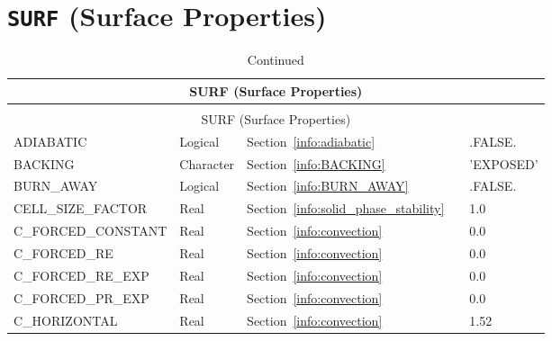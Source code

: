 \documentclass[11pt]{book}
\begin{document}
\vspace{\baselineskip}


\section{\texorpdfstring{{\tt SURF}}{SURF} (Surface Properties)}

\begin{longtable}{@{\extracolsep{\fill}}|l|l|l|l|l|}
\caption[Surface properties ({\ct SURF} namelist group)]{For more information see Section~\ref{info:SURF}.}
\label{tbl:SURF} \\
\hline
\multicolumn{5}{|c|}{{\ct SURF} (Surface Properties)} \\
\hline \hline
\endfirsthead
\caption[]{Continued} \\
\hline
\multicolumn{5}{|c|}{{\ct SURF} (Surface Properties)} \\
\hline \hline
\endhead
{\ct ADIABATIC}                       & Logical         & Section~\ref{info:adiabatic}              &                     & {\ct .FALSE.}           \\ \hline
{\ct BACKING}                         & Character       & Section~\ref{info:BACKING}                &                     & {\ct 'EXPOSED'}         \\ \hline
{\ct BURN\_AWAY}                      & Logical         & Section~\ref{info:BURN_AWAY}              &                     & {\ct .FALSE.}           \\ \hline
{\ct CELL\_SIZE\_FACTOR}              & Real            & Section~\ref{info:solid_phase_stability}  &                     & 1.0                     \\ \hline
{\ct C\_FORCED\_CONSTANT}             & Real            & Section~\ref{info:convection}             &                     & 0.0                     \\ \hline
{\ct C\_FORCED\_RE}                   & Real            & Section~\ref{info:convection}             &                     & 0.0                     \\ \hline
{\ct C\_FORCED\_RE\_EXP}              & Real            & Section~\ref{info:convection}             &                     & 0.0                     \\ \hline
{\ct C\_FORCED\_PR\_EXP}              & Real            & Section~\ref{info:convection}             &                     & 0.0                     \\ \hline
{\ct C\_HORIZONTAL}                   & Real            & Section~\ref{info:convection}             &                     & 1.52                    \\ \hline

\end{longtable}
\end{document}
